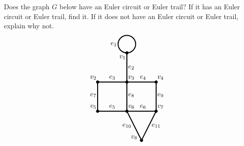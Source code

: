 \documentclass[11pt,letterpaper]{article}
\begin{document}

 Does the graph $G$ below have an Euler circuit or Euler trail? If it has an Euler circuit or Euler trail, find it. If it does not have an Euler circuit or Euler trail, explain why not. 
	\[
	\begin{tikzpicture}[scale=1.5]
	\draw[line width=0.05cm] (0,2.3) circle (0.3);
	\draw[line width=0.05cm] (0,2) to (0,1);
	\draw[line width=0.05cm] (-1,1) to (1,1);
	\draw[line width=0.05cm] (-1,0) to (1,0);
	\draw[line width=0.05cm] (-1,1) to (-1,0);
	\draw[line width=0.05cm] (1,1) to (1,0);
	\draw[line width=0.05cm] (0,1) to (0,0);
	\draw[line width=0.05cm] (0,0) to (0.5,-1);
	\draw[line width=0.05cm] (1,0) to (0.5,-1);
	
	\draw[fill= black] (0,2) circle (0.05);
	\draw[fill= black] (-1,1) circle (0.05);
	\draw[fill= black] (0,1) circle (0.05);
	\draw[fill= black] (1,1) circle (0.05);
	\draw[fill= black] (-1,0) circle (0.05);
	\draw[fill= black] (0,0) circle (0.05);
	\draw[fill= black] (1,0) circle (0.05);
	\draw[fill= black] (0.5,-1) circle (0.05);
	
	\node at (-0.15,1.85) {$v_1$};
	\node at (-1.15,1.15) {$v_2$};
	\node at (0.15,1.15) {$v_3$};
	\node at (1.15,1.15) {$v_4$};
	\node at (-1.15,0.15) {$v_5$};
	\node at (0.15,0.15) {$v_6$};
	\node at (1.15,0.15) {$v_7$};
	\node at (0.25,-0.90) {$v_8$};

	\node at (-0.45,2.3) {$e_1$};
	\node at (0.15,1.5) {$e_2$};
	\node at (-0.5, 1.15) {$e_3$};
	\node at (0.55,1.15) {$e_4$};
	\node at (-0.5,0.15) {$e_5$};
	\node at (0.55,0.15) {$e_6$};
	\node at (-1.15,0.55) {$e_7$};
	\node at (0.15,0.55) {$e_8$};
	\node at (1.15,0.55) {$e_9$};
	\node at (0,-0.5) {$e_{10}$};
	\node at (1,-0.5) {$e_{11}$};
	\end{tikzpicture}
	\]



\newpage
\end{document}
